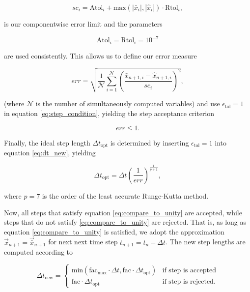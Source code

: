 \begin{equation}
sc_i = \text{Atol}_i + \text{max}\left(\left|\bar{x}_i\right|,\left|\widehat{x}_i\right|\right)\cdot \text{Rtol}_i,
\end{equation}

\noindent is our componentwise error limit and the parameters

\begin{equation}
\text{Atol}_i = \text{Rtol}_i = 10^{-7}
\end{equation}

\noindent are used consistently. This allows us to define our error measure

\begin{equation}\label{eq:error}
err = \sqrt{\frac{1}{\mathcal{N}}\sum_{i=1}^{\mathcal{N}}\left(\frac{\bar{x}_{n+1,i}-\widehat{x}_{n+1,i}}{sc_i}\right)^2},
\end{equation}

\noindent (where $\mathcal{N}$ is the number of simultaneously computed variables) and use $\epsilon_{\text{tol}}=1$ in equation \eqref{eq:step_condition}, yielding the step acceptance criterion

\begin{equation}\label{eq:compare_to_unity}
err \leq 1.
\end{equation} 

\noindent Finally, the ideal step length $\Delta t_{\text{opt}}$ is determined by inserting $\epsilon_{\text{tol}}=1$ into equation \eqref{eq:dt_new}, yielding

\begin{equation}
\Delta t_{\text{opt}} = \Delta t\left(\frac{1}{err}\right)^\frac{1}{p+1},
\end{equation}

\noindent where $p=7$ is the order of the least accurate Runge-Kutta method. 

Now, all steps that satisfy equation \eqref{eq:compare_to_unity} are accepted,  while steps that do not satisfy \eqref{eq:compare_to_unity} are rejected. That is, as long as equation \eqref{eq:compare_to_unity} is satisfied, we adopt the approximation $\vec{x}_{n+1} = \vec{\bar{x}}_{n+1}$ for next next time step $t_{n+1}=t_n+\Delta t$. The new step lengths are computed according to

\begin{equation}
	\Delta t_{\text{new}} = 
	\begin{cases}
    \text{min}\left(\text{fac}_{\text{max}}\cdot \Delta t, \text{fac}\cdot \Delta t_{\text{opt}}\right) & \text{if step is accepted} \\
    \text{fac}\cdot \Delta t_{\text{opt}} & \text{if step is rejected}.
    \end{cases}
\end{equation}

